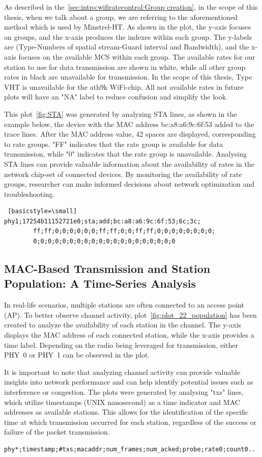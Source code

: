 As described in the~\ref{sec:intro:wifiratecontrol:Group creation}, in the scope of this thesis, when we talk about a group, we are referring to the aforementioned method which is used by Minstrel-HT. As shown in the plot, the y-axis focuses on groups, and the x-axis produces the indexes within each group. The y-labels are (Type-Numbers of spatial stream-Guard interval and Bandwidth), and the x-axis focuses on the available MCS within each group. The available rates for our station to use for data transmission are shown in white, while all other group rates in black are unavailable for transmission. In the scope of this thesis, Type VHT is unavailable for the ath9k WiFi-chip. All not available rates in future plots will have an "NA" label to reduce confusion and simplify the look.

This plot~\ref{fig:STA} was generated by analyzing STA lines, as shown in the example below, the device with the MAC address bc:a8:a6:9c:6f:53 added to the trace lines. After the MAC address value, 42 spaces are displayed, corresponding to rate groups. "FF" indicates that the rate group is available for data transmission, while "0" indicates that the rate group is unavailable.
Analysing STA lines can provide valuable information about the availability of rates in the network chip-set of connected devices. By monitoring the availability of rate groups, researcher can make informed decisions about network optimization and troubleshooting.

\begin{lstlisting} [basicstyle=\small]
phy1;17254b11152721e0;sta;add;bc:a8:a6:9c:6f:53;6c;3c;
        ff;ff;0;0;0;0;0;0;ff;ff;0;0;ff;ff;0;0;0;0;0;0;0;0;
        0;0;0;0;0;0;0;0;0;0;0;0;0;0;0;0;0;0;0;0
\end{lstlisting}
\newpage
\subsection{MAC-Based Transmission and Station Population: A Time-Series Analysis}
\label{population}
In real-life scenarios, multiple stations are often connected to an access point (AP). To better observe channel activity, plot~\ref{fig:plot_22_population} has been created to analyze the availability of each station in the channel. 
The y-axis displays the MAC address of each connected station, while the x-axis provides a time label. Depending on the radio being leveraged for transmission, either PHY~0 or PHY~1 can be observed in the plot.

It is important to note that analyzing channel activity can provide valuable insights into network performance and can help identify potential issues such as interference or congestion. The plots were generated by analysing "txs" lines, which utilize timestamps (UNIX nanosecond) as a time indicator and MAC addresses as available stations. This allows for the identification of the specific time at which transmission occurred for each station, regardless of the success or failure of the packet transmission.
\vspace{0.5cm}
\begin{lstlisting}[basicstyle=\small]
phy*;timestamp;#txs;macaddr;num_frames;num_acked;probe;rate0;count0..
\end{lstlisting}


